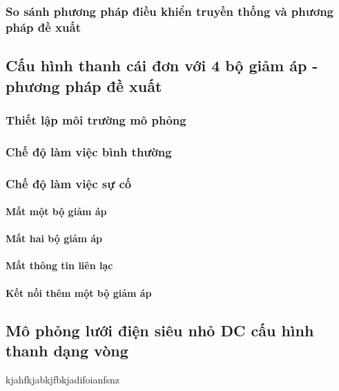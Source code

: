 \subsubsection{So sánh phương pháp điều khiển truyền thống và phương pháp đề xuất}
\lipsum[8]
\subsection{Cấu hình thanh cái đơn với 4 bộ giảm áp - phương pháp đề xuất}
\subsubsection{Thiết lập môi trường mô phỏng}

\subsubsection{Chế độ làm việc bình thường}

\subsubsection{Chế độ làm việc sự cố}
\paragraph{Mất một bộ giảm áp}

\paragraph{Mất hai bộ giảm áp}

\paragraph{Mất thông tin liên lạc}

\paragraph{Kết nối thêm một bộ giảm áp}

\subsection{Mô phỏng lưới điện siêu nhỏ DC cấu hình thanh dạng vòng}
kjahfkjabkjfbkjadifoianfsnz